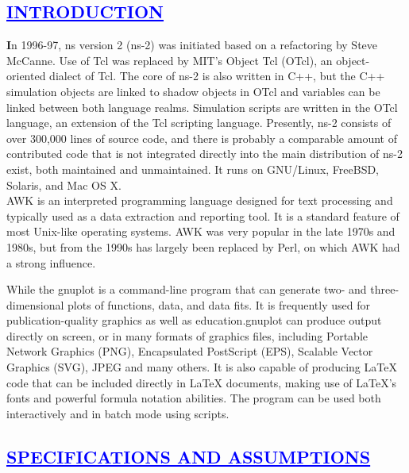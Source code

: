 \documentclass[a4paper,12pt]{report}
\begin{document}
\begin{center}
\chapter{\textcolor{blue}{\underline {INTRODUCTION}}}
\end{center}
\noindent \textbf In 1996-97, ns version 2 (ns-2) was initiated based on a refactoring by Steve McCanne. Use of Tcl was replaced by MIT's Object Tcl (OTcl), an object-oriented dialect of Tcl.
		  The core of ns-2 is also written in C++, but the C++ simulation objects are linked to shadow objects in OTcl and variables can be linked between both language realms.
		  Simulation scripts are written in the OTcl language, an extension of the Tcl scripting language.
                  Presently, ns-2 consists of over 300,000 lines of source code, and there is probably a comparable amount of contributed code that is not integrated directly into the main distribution of ns-2 exist,
                  both maintained and unmaintained. It runs on GNU/Linux, FreeBSD, Solaris, and Mac OS X.
		  \\AWK is an interpreted programming language designed for text processing and typically used as a data extraction and reporting tool. 
		  It is a standard feature of most Unix-like operating systems. AWK was very popular in the late 1970s and 1980s, but from the 1990s has largely been replaced by Perl,
		  on which AWK had a strong influence.
		  
		 While the gnuplot is a command-line program that can generate two- and three-dimensional plots of functions, data, and data fits. 
		    It is frequently used for publication-quality graphics as well as education.gnuplot can produce output directly on screen, 
		    or in many formats of graphics files, including Portable Network Graphics (PNG), Encapsulated PostScript (EPS), Scalable Vector Graphics (SVG), JPEG and many others. 
		    It is also capable of producing LaTeX code that can be included directly in LaTeX documents, making use of LaTeX's fonts and powerful formula notation abilities.
		    The program can be used both interactively and in batch mode using scripts.

\begin{center}
\chapter{\textcolor{blue}{\underline {SPECIFICATIONS AND ASSUMPTIONS}}}
\end{center}
\end{document}
